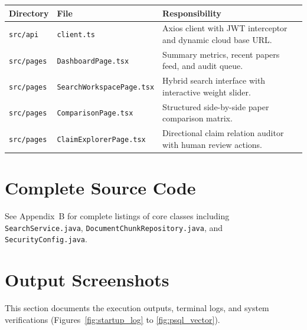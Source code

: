 \documentclass[11pt,a4paper,titlepage]{report}
\begin{document}
\begin{center}
\label{tab:code_frontend}
\vspace{3pt}
\begin{tabularx}{\textwidth}{llX}
\toprule
\textbf{Directory} & \textbf{File} & \textbf{Responsibility} \\
\midrule
\texttt{src/api} & \texttt{client.ts} & Axios client with JWT interceptor and dynamic cloud base URL. \\
\texttt{src/pages} & \texttt{DashboardPage.tsx} & Summary metrics, recent papers feed, and audit queue. \\
\texttt{src/pages} & \texttt{SearchWorkspacePage.tsx} & Hybrid search interface with interactive weight slider. \\
\texttt{src/pages} & \texttt{ComparisonPage.tsx} & Structured side-by-side paper comparison matrix. \\
\texttt{src/pages} & \texttt{ClaimExplorerPage.tsx} & Directional claim relation auditor with human review actions. \\
\bottomrule
\end{tabularx}
\end{center}

\section{Complete Source Code}
See Appendix~B for complete listings of core classes including \texttt{SearchService.java}, \texttt{DocumentChunkRepository.java}, and \texttt{SecurityConfig.java}.

\section{Output Screenshots}
This section documents the execution outputs, terminal logs, and system verifications (Figures~\ref{fig:startup_log} to \ref{fig:psql_vector}).
\end{document}
